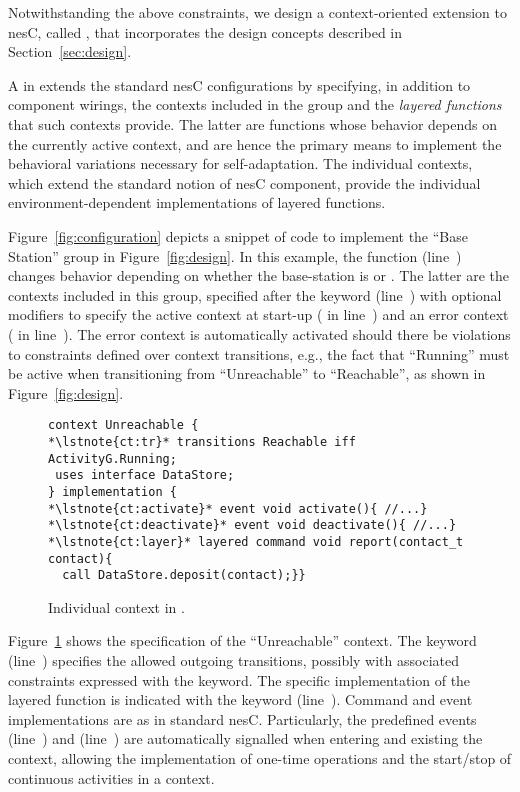 \fakepar{\conesc} Notwithstanding the above constraints, we design a
context-oriented extension to nesC, called \conesc, that incorporates
the design concepts described in Section~\ref{sec:design}.

A  in \conesc extends the standard nesC
configurations by specifying, in addition to component wirings, the
contexts included in the group and the \emph{layered
  functions}~\cite{cop} that such contexts provide. The latter are
functions whose behavior depends on the currently active context, and
are hence the primary means to implement the behavioral variations
necessary for self-adaptation. The individual contexts, which extend
the standard notion of nesC component, provide the individual
environment-dependent implementations of layered functions.

Figure~\ref{fig:configuration} depicts a snippet of \conesc code to
implement the ``Base Station'' group in Figure~\ref{fig:design}. In
this example, the  function (line~)
changes behavior depending on whether the base-station is
 or . The latter are the contexts
included in this group, specified after the keyword 
(line~) with optional modifiers to specify the active
context at start-up ( in line~) and an
error context ( in line~). The error
context is automatically activated should there be violations to
constraints defined over context transitions, e.g., the fact that
``Running'' must be active when transitioning from
``Unreachable'' to ``Reachable'', as shown in Figure~\ref{fig:design}.

\begin{figure}[!tb]
\begin{lstlisting}[style=conescframe]
context Unreachable {
*\lstnote{ct:tr}* transitions Reachable iff ActivityG.Running;
 uses interface DataStore;
} implementation {
*\lstnote{ct:activate}* event void activate(){ //...}
*\lstnote{ct:deactivate}* event void deactivate(){ //...}
*\lstnote{ct:layer}* layered command void report(contact_t contact){
  call DataStore.deposit(contact);}}
\end{lstlisting}
\vspace{-4mm}
\caption{Individual context in \conesc.}
  \label{fig:context}
\vspace{-2mm}
\end{figure}

Figure~\ref{fig:context} shows the \conesc specification of the
``Unreachable'' context. The keyword 
(line~) specifies the allowed outgoing transitions,
possibly with associated constraints expressed with the 
keyword. The specific implementation of the layered function is
indicated with the  keyword
(line~). Command and event implementations are as in
standard nesC. Particularly, the predefined events 
(line~) and 
(line~) are automatically signalled when entering
and existing the context, allowing the implementation of one-time
operations and the start/stop of continuous activities in a context.


